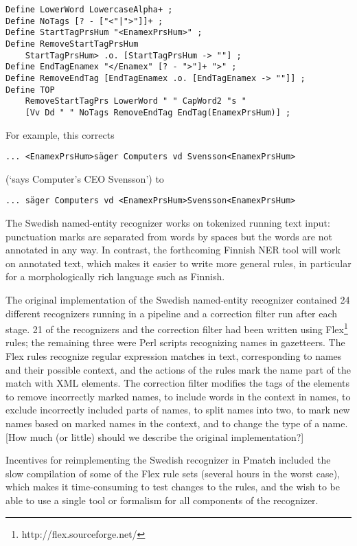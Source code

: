 \documentclass{llncs}
\begin{document}
\begin{verbatim}
Define LowerWord LowercaseAlpha+ ;
Define NoTags [? - ["<"|">"]]+ ;
Define StartTagPrsHum "<EnamexPrsHum>" ;
Define RemoveStartTagPrsHum
    StartTagPrsHum> .o. [StartTagPrsHum -> ""] ;
Define EndTagEnamex "</Enamex" [? - ">"]+ ">" ;
Define RemoveEndTag [EndTagEnamex .o. [EndTagEnamex -> ""]] ;
Define TOP
    RemoveStartTagPrs LowerWord " " CapWord2 "s "
    [Vv Dd " " NoTags RemoveEndTag EndTag(EnamexPrsHum)] ;
\end{verbatim}

For example, this corrects

\begin{verbatim}
... <EnamexPrsHum>säger Computers vd Svensson<EnamexPrsHum>
\end{verbatim}

\noindent
(`says Computer's CEO Svensson') to

\begin{verbatim}
... säger Computers vd <EnamexPrsHum>Svensson<EnamexPrsHum>
\end{verbatim}

The Swedish named-entity recognizer works on tokenized running text
input: punctuation marks are separated from words by spaces but the
words are not annotated in any way. In contrast, the forthcoming
Finnish NER tool will work on annotated text, which makes it easier to
write more general rules, in particular for a morphologically rich
language such as Finnish.

The original implementation of the Swedish named-entity recognizer
\cite{kokkinakis/2003} contained 24 different recognizers running in a
pipeline and a correction filter run after each stage. 21 of the
recognizers and the correction filter had been written using
Flex\footnote{http://flex.sourceforge.net/} rules; the remaining three
were Perl scripts recognizing names in gazetteers. The Flex rules
recognize regular expression matches in text, corresponding to names
and their possible context, and the actions of the rules mark the name
part of the match with XML elements. The correction filter modifies
the tags of the elements to remove incorrectly marked names, to
include words in the context in names, to exclude incorrectly included
parts of names, to split names into two, to mark new names based on
marked names in the context, and to change the type of a name.
\textsf{[How much (or little) should we describe the original
  implementation?]}

Incentives for reimplementing the Swedish recognizer in Pmatch
included the slow compilation of some of the Flex rule sets (several
hours in the worst case), which makes it time-consuming to test
changes to the rules, and the wish to be able to use a single tool or
formalism for all components of the recognizer.
\end{document}
